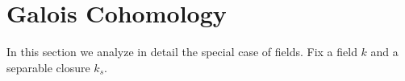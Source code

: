 \section{Galois Cohomology}

In this section we analyze in detail the special case of fields. Fix a field $k$ and a separable closure $k_s$.
